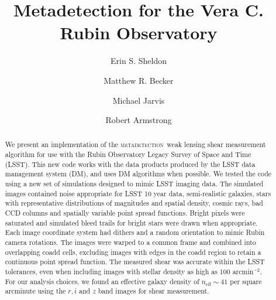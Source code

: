 \documentclass[twocolumn,twocolappendix,astrosym]{openjournal}
\newcommand{\mdet}{\textsc{metadetection}}
\newcommand{\Mcal}{\textsc{Metacalibration}}
\newcommand{\Mdet}{\textsc{Metadetection}}
\begin{document}



\title{Metadetection for the Vera C. Rubin Observatory}

\author{Erin S. Sheldon}
\author{Matthew R. Becker}
\author{Michael Jarvis}
\author{Robert Armstrong}


\begin{abstract}

        We present an implementation of the \mdet\ weak lensing shear
        measurement algorithm for use with the Rubin Observatory Legacy Survey
        of Space and Time (LSST).  This new code works with the data products
        produced by the LSST data management system (DM), and uses DM
        algorithms when possible.  We tested the code using a new set of
        simulations designed to mimic LSST imaging data.  The simulated images
        contained noise appropriate for LSST 10 year data, semi-realistic
        galaxies, stars with representative distributions of magnitudes and
        spatial density, cosmic rays, bad CCD columns and spatially variable
        point spread functions.  Bright pixels were saturated and simulated
        bleed trails for bright stars were drawn when appropriate.  Each image
        coordinate system had dithers and a random orientation to mimic Rubin
        camera rotations.  The images were warped to a common frame and
        combined into overlapping coadd cells, excluding images with edges in
        the coadd region to retain a continuous point spread function.  The
        measured shear was accurate within the LSST tolerances, even when
        including images with stellar density as high as 100 arcmin$^{-2}$.
        For our analysis choices, we found an effective galaxy density of
        $n_{\mathrm{eff}} \sim 41$ per square arcminute using the $r, i$ and
        $z$ band images for shear measurement.

\end{abstract}
\end{document}
